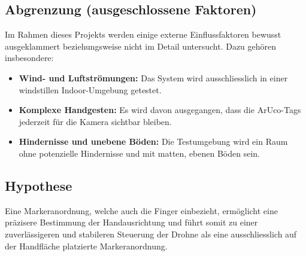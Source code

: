 \subsection{Abgrenzung (ausgeschlossene Faktoren)}
Im Rahmen dieses Projekts werden einige externe Einflussfaktoren bewusst ausgeklammert beziehungsweise nicht im Detail untersucht.
Dazu gehören insbesondere:
\begin{itemize}
  \item \textbf{Wind- und Luftströmungen:} Das System wird ausschliesslich in einer windstillen Indoor-Umgebung getestet.
  \item \textbf{Komplexe Handgesten:} Es wird davon ausgegangen, dass die ArUco-Tags jederzeit für die Kamera sichtbar bleiben.
  \item \textbf{Hindernisse und unebene Böden:} Die Testumgebung wird ein Raum ohne potenzielle Hindernisse und mit matten, ebenen Böden sein.\footnotemark{}
\end{itemize}

\subsection{Hypothese}
Eine Markeranordnung, welche auch die Finger einbezieht, ermöglicht eine präzisere Bestimmung der Handausrichtung und führt somit zu einer zuverlässigeren und stabileren Steuerung der Drohne als eine ausschliesslich auf der Handfläche platzierte Markeranordnung.

\endgroup